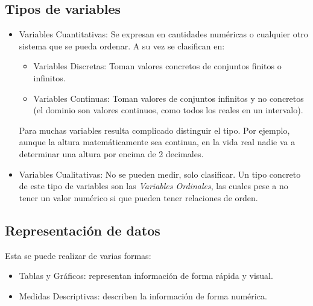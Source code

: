 \documentclass[10pt,a4paper]{book}
\begin{document}
\subsection{Tipos de variables}
\begin{itemize}
	\item Variables Cuantitativas: Se expresan en cantidades numéricas o cualquier otro sistema que se pueda ordenar. A su vez se clasifican en:
		\begin{itemize}
			\item Variables Discretas: Toman valores concretos de conjuntos finitos o infinitos.
			\item Variables Continuas: Toman valores de conjuntos infinitos y no concretos (el dominio son valores continuos, como todos los reales en un intervalo).
		\end{itemize}
	Para muchas variables resulta complicado distinguir el tipo. Por ejemplo, aunque la altura matemáticamente sea continua, en la vida real nadie va a determinar una altura por encima de 2 decimales.
	\item Variables Cualitativas: No se pueden medir, solo clasificar. Un tipo concreto de este tipo de variables son las \textit{Variables Ordinales}, las cuales pese a no tener un valor numérico si que pueden tener relaciones de orden.  
\end{itemize}

\subsection{Representación de datos}
Esta se puede realizar de varias formas: 
\begin{itemize}
	\item Tablas y Gráficos: representan información de forma rápida y visual.
	\item Medidas Descriptivas: describen la información de forma numérica.
\end{itemize}
\end{document}
